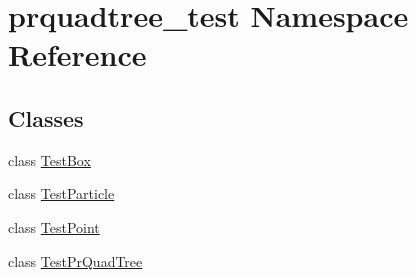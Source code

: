 \section{prquadtree\+\_\+test Namespace Reference}
\label{namespaceprquadtree__test}
\subsection*{Classes}
\begin{DoxyCompactItemize}
\item 
class \hyperlink{classprquadtree__test_1_1TestBox}{Test\+Box}
\item 
class \hyperlink{classprquadtree__test_1_1TestParticle}{Test\+Particle}
\item 
class \hyperlink{classprquadtree__test_1_1TestPoint}{Test\+Point}
\item 
class \hyperlink{classprquadtree__test_1_1TestPrQuadTree}{Test\+Pr\+Quad\+Tree}
\end{DoxyCompactItemize}
